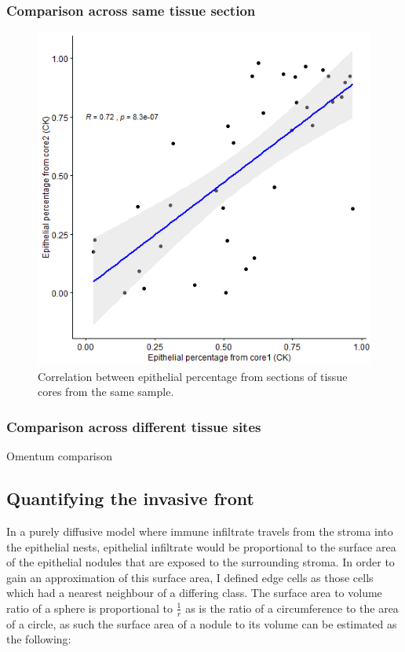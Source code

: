 \subsubsection{Comparison across same tissue section}
\begin{figure}
    \centering
    \includegraphics{Chapter3/Figs/correlation_T_CK1_Ck2.png}
    \caption{Correlation between epithelial percentage from sections of tissue cores from the same sample.}
    \label{fig:epi_percent_2slides}
\end{figure}

\subsubsection{Comparison across different tissue sites}

Omentum comparison

\subsection{Quantifying the invasive front}
In a purely diffusive model where immune infiltrate travels from the stroma into the epithelial nests, epithelial infiltrate would be proportional to the surface area of the epithelial nodules that are exposed to the surrounding stroma. In order to gain an approximation of this surface area, I defined edge cells as those cells which had a nearest neighbour of a differing class. The surface area to volume ratio of a sphere is proportional to $\frac{1}{r}$ as is the ratio of a circumference to the area of a circle, as such the surface area of a nodule to its volume can be estimated as the following:

